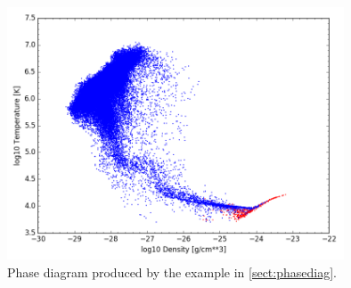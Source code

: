 \documentclass[10pt, a4paper]{article}
\begin{document}
\begin{figure}
\centering
\includegraphics[width=10cm]{python_examples/PhaseDiagram}
\caption{Phase diagram produced by the example in \ref{sect:phasediag}.}
\label{fig:rot_curve}
\end{figure}

\newpage
\end{document}
